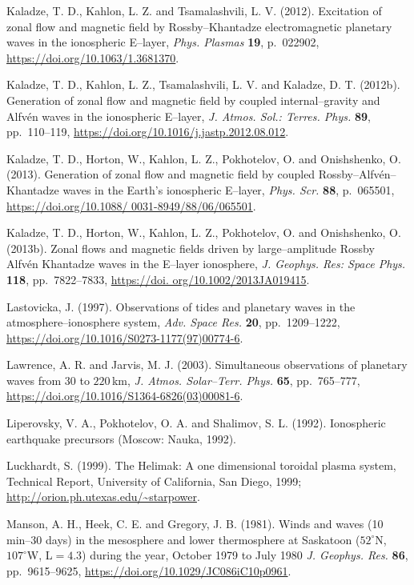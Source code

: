\documentclass[a4paper,openany,12pt]{report}
\begin{document}
\begin{thebibliography}{100}
\bibitem{}
Kaladze, T. D., Kahlon, L. Z. and Tsamalashvili, L. V. (2012). Excitation of zonal flow and magnetic field by Rossby--Khantadze electromagnetic planetary waves in the ionospheric E--layer, \emph{Phys. Plasmas} \textbf{19}, 
p.~022902, \url{https://doi.org/10.1063/1.3681370}.

\bibitem{}
Kaladze, T. D., Kahlon, L. Z., Tsamalashvili, L. V. and Kaladze, D. T. (2012b). Generation of zonal flow and magnetic field by coupled internal--gravity and Alfv\'en waves in the ionospheric E--layer, \emph{J. Atmos. Sol.: Terres. Phys.}
\textbf{89}, pp.~110--119, \url{https://doi.org/10.1016/j.jastp.2012.08.012}.

\bibitem{}
Kaladze, T. D., Horton, W., Kahlon, L. Z., Pokhotelov, O. and Onishshenko, O. (2013). Generation of zonal flow and magnetic field by coupled Rossby--Alfv\'en--Khantadze waves in the Earth's ionospheric E--layer, \emph{Phys. Scr.} \textbf{88}, p.~065501, \url{https://doi.org/10.1088/ 0031-8949/88/06/065501}.

\bibitem{}
Kaladze, T. D., Horton, W., Kahlon, L. Z., Pokhotelov, O. and Onishshenko, O. (2013b). Zonal flows and magnetic fields driven by large--amplitude Rossby Alfv\'en Khantadze waves in the E--layer ionosphere, \emph{J. Geophys. Res: Space Phys.} \textbf{118}, pp.~7822--7833, \url{https://doi. org/10.1002/2013JA019415}.

\bibitem{}
Lastovicka, J. (1997). Observations of tides and planetary waves in the atmosphere--ionosphere system, \emph{Adv. Space Res.} \textbf{20}, pp.~1209--1222, \url{https://doi.org/10.1016/S0273-1177(97)00774-6}. 

\bibitem{}
Lawrence, A. R. and Jarvis, M. J. (2003). Simultaneous observations of planetary waves from 30 to $220\,$km, {\it J. Atmos. Solar--Terr. Phys.} \textbf{65}, pp.~765--777, \url{https://doi.org/10.1016/S1364-6826(03)00081-6}.

\bibitem{}
Liperovsky, V. A., Pokhotelov, O. A. and Shalimov, S. L. (1992). Ionospheric earthquake precursors (Moscow: Nauka, 1992).

\bibitem{}
Luckhardt, S. (1999). The Helimak: A one dimensional toroidal plasma system, Technical Report, University of California, San Diego, 1999; \url{http://orion.ph.utexas.edu/~starpower}.

\bibitem{}
Manson, A. H., Heek, C. E. and Gregory, J. B. (1981). Winds and waves (10 min--30 days) in the mesosphere and lower thermosphere at Saskatoon ($52^\circ$N, $107^\circ$W, L$=4.3$) during the year, October 1979 to July 1980 {\it J. Geophys. Res.} \textbf{86}, pp.~9615--9625, \url{https://doi.org/10.1029/JC086iC10p0961}.


\end{thebibliography}
\end{document}
